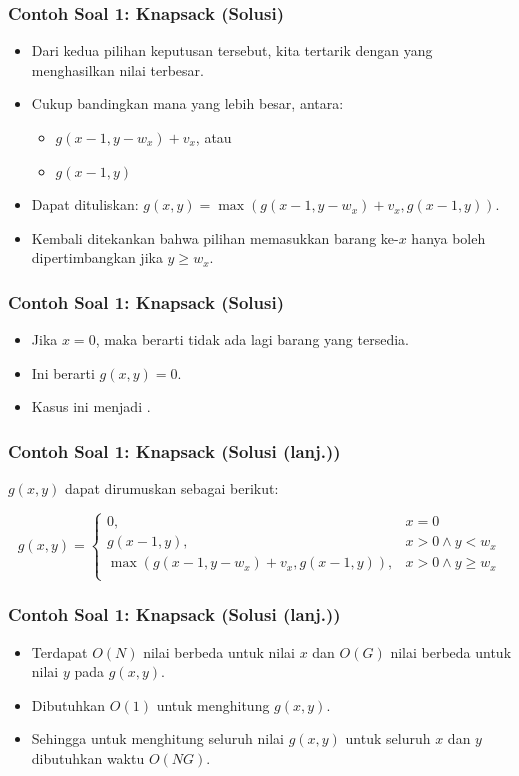 \begin{frame} 
\frametitle{Contoh Soal 1: Knapsack (Solusi)}
\begin{itemize}
  \item Dari kedua pilihan keputusan tersebut, kita tertarik dengan yang menghasilkan nilai terbesar.
  \item Cukup bandingkan mana yang lebih besar, antara:
  \begin{itemize}
    \item $g(x-1, y-w_x) + v_x$, atau
    \item $g(x-1, y)$
  \end{itemize}
  \item Dapat dituliskan: $g(x, y) = \max(g(x-1,y-w_x)+v_x,g(x-1,y))$. \newline
  \item Kembali ditekankan bahwa pilihan memasukkan barang ke-$x$ hanya boleh dipertimbangkan jika $y \geq w_x$.
\end{itemize}
\end{frame}

\begin{frame} 
\frametitle{Contoh Soal 1: Knapsack (Solusi)}
\begin{itemize}
  \item Jika $x=0$, maka berarti tidak ada lagi barang yang tersedia. 
  \item Ini berarti $g(x,y) = 0$.
  \item Kasus ini menjadi \fbasecase.
\end{itemize}
\end{frame}

\begin{frame} 
\frametitle{Contoh Soal 1: Knapsack (Solusi (lanj.))}
$g(x,y)$ dapat dirumuskan sebagai berikut:
\begin{small}
\[g(x,y) = \left\{\begin{array}{lr}
    0, & x = 0\\
    g(x-1,y), & x > 0 \wedge y < w_x\\
    \max(g(x-1,y-w_x)+v_x,g(x-1,y)), & x > 0 \wedge y \geq w_x\\
    \end{array}\right.\]
\end{small}
\end{frame}

\begin{frame} 
\frametitle{Contoh Soal 1: Knapsack (Solusi (lanj.))}
\begin{itemize}
  \item Terdapat $O(N)$ nilai berbeda untuk nilai $x$ dan $O(G)$ nilai berbeda untuk nilai $y$ pada $g(x,y)$.
  \item Dibutuhkan $O(1)$ untuk menghitung $g(x,y)$. 
  \item Sehingga untuk menghitung seluruh nilai $g(x,y)$ untuk seluruh $x$ dan $y$ dibutuhkan waktu $O(NG)$.
\end{itemize}
\end{frame}

